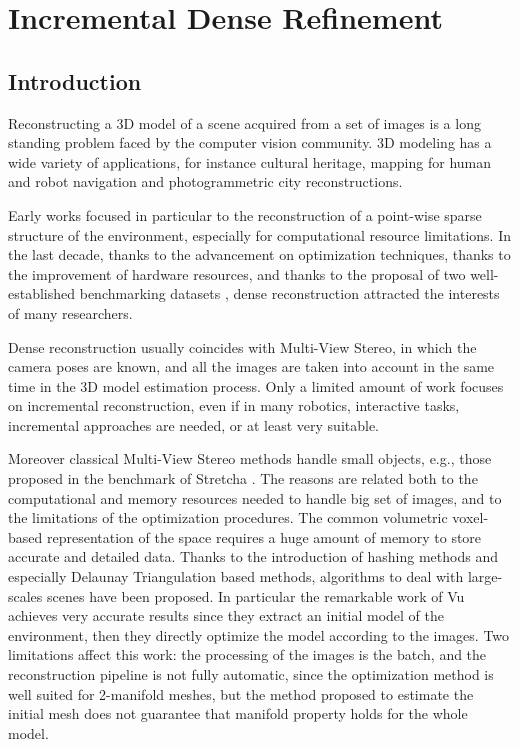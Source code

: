 \chapter{Incremental Dense Refinement}
\label{ch:incrDenseRef}



\section{Introduction}
Reconstructing a 3D model of a scene acquired from a set of images is a long standing problem faced by the computer vision community. 
3D modeling has a wide variety of applications, for instance cultural heritage, mapping for human and robot navigation and photogrammetric city reconstructions.


Early works focused in particular to the reconstruction of a point-wise sparse structure of the environment, especially for computational resource limitations.
In the last decade, thanks to the advancement on optimization techniques,  thanks to the improvement of hardware resources, and thanks to the proposal of two well-established benchmarking datasets \cite{seitz_et_al06,strecha2008},  dense reconstruction attracted the interests of many researchers.

Dense reconstruction usually coincides with Multi-View Stereo, in which the camera poses are known, and all the images are taken into account in the same time in the 3D model estimation process.
Only a limited amount of work focuses on incremental reconstruction, even if in many robotics, interactive tasks, incremental approaches are needed, or at least very suitable.

Moreover classical Multi-View Stereo methods \cite{gargallo2005bayesian,delaunoy_et_al_08} handle small objects, e.g., those proposed in the benchmark of Stretcha \etal \cite{strecha2006combined}.
The reasons are related both to the computational and memory resources needed to handle big set of images, and to the limitations of the optimization procedures.
The common volumetric voxel-based representation of the space requires a huge amount of memory to store accurate and detailed data.
Thanks to the introduction of hashing methods and especially  Delaunay Triangulation based methods, algorithms to deal with large-scales scenes have been proposed.
In particular the remarkable work of Vu \etal \cite{vu_et_al_2012} achieves very accurate results since they extract an initial model of the environment, then they directly optimize the model according to the images. 
Two limitations affect this work: the processing of the images is the batch, and the reconstruction pipeline is not fully automatic, since the optimization method is well suited for 2-manifold meshes, but the method proposed to estimate the initial mesh does not guarantee that manifold property holds for the whole model.


